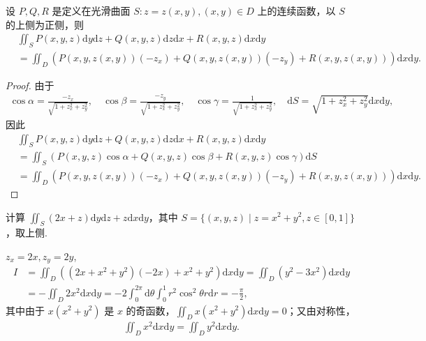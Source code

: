 \documentclass[../../main.tex]{subfiles}%
\begin{document}
\begin{theorem}
设 $P, Q, R$ 是定义在光滑曲面 $S: z = z(x,y), (x,y) \in D$ 上的连续函数，以 $S$ 的上侧为正侧，则
\begin{align*}
&\iint_S P(x,y,z) \mathrm{d}y\mathrm{d}z + Q(x,y,z) \mathrm{d}z\mathrm{d}x + R(x,y,z) \mathrm{d}x\mathrm{d}y \\
&= \iint_D (P(x,y,z(x,y))(-z_x) + Q(x,y,z(x,y))(-z_y) + R(x,y,z(x,y))) \mathrm{d}x\mathrm{d}y.
\end{align*}
\end{theorem}
\begin{proof}
由于
\begin{align*}
\cos\alpha = \frac{-z_x}{\sqrt{1+z_x^2+z_y^2}}, \quad \cos\beta = \frac{-z_y}{\sqrt{1+z_x^2+z_y^2}}, \quad \cos\gamma = \frac{1}{\sqrt{1+z_x^2+z_y^2}}, \quad \mathrm{d}S = \sqrt{1+z_x^2+z_y^2} \mathrm{d}x\mathrm{d}y,
\end{align*}
因此
\begin{align*}
&\iint_S P(x,y,z) \mathrm{d}y\mathrm{d}z + Q(x,y,z) \mathrm{d}z\mathrm{d}x + R(x,y,z) \mathrm{d}x\mathrm{d}y \\
&= \iint_S (P(x,y,z)\cos\alpha + Q(x,y,z)\cos\beta + R(x,y,z)\cos\gamma) \mathrm{d}S \\
&= \iint_D (P(x,y,z(x,y))(-z_x) + Q(x,y,z(x,y))(-z_y) + R(x,y,z(x,y))) \mathrm{d}x\mathrm{d}y.
\end{align*}
\end{proof}

\begin{example}
计算 $\iint_S (2x+z) \mathrm{d}y\mathrm{d}z + z \mathrm{d}x\mathrm{d}y$，其中 $S = \{(x,y,z) \mid z = x^2 + y^2, z \in [0,1]\}$，取上侧.
\end{example}

\begin{solution}
$z_x = 2x, z_y = 2y$,
\begin{align*}
I &= \iint_D ((2x + x^2 + y^2)(-2x) + x^2 + y^2) \mathrm{d}x\mathrm{d}y = \iint_D (y^2 - 3x^2) \mathrm{d}x\mathrm{d}y \\
&= -\iint_D 2x^2 \mathrm{d}x\mathrm{d}y = -2 \int_0^{2\pi} \mathrm{d}\theta \int_0^1 r^2 \cos^2\theta r \mathrm{d}r = -\frac{\pi}{2},
\end{align*}
其中由于 $x(x^2 + y^2)$ 是 $x$ 的奇函数，$\iint_D x(x^2 + y^2) \mathrm{d}x\mathrm{d}y = 0$；又由对称性，
\begin{align*}
\iint_D x^2 \mathrm{d}x\mathrm{d}y = \iint_D y^2 \mathrm{d}x\mathrm{d}y.
\end{align*}
\end{solution}
\end{document}
